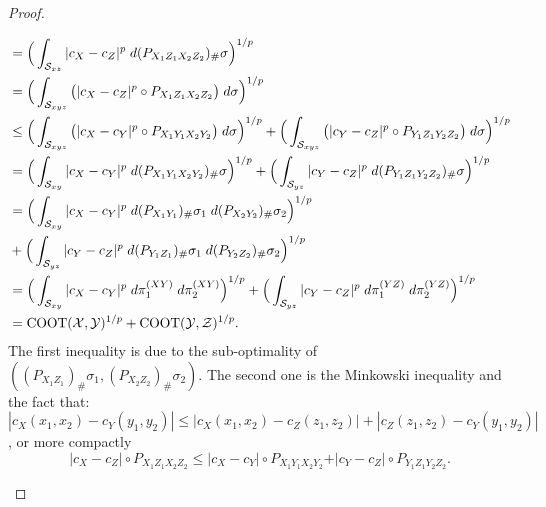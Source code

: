 \begin{proof}
\begin{enumerate}
\begin{equation}
\begin{split}
          &= \Big( \int_{\mathcal S_{xz}} \vert c_X - c_Z \vert^p
          \; d(P_{X_1 Z_1 X_2 Z_2})_{\#} \sigma \Big)^{1/p} \\
          &= \Big( \int_{\mathcal S_{xyz}} \big( \vert c_X - c_Z \vert^p \circ P_{X_1 Z_1 X_2 Z_2} \big)
          \; d \sigma \Big)^{1/p} \\
          &\leq \Big( \int_{\mathcal S_{xyz}} \big( \vert c_X - c_Y \vert^p \circ P_{X_1 Y_1 X_2 Y_2} \big)
          \; d \sigma \Big)^{1/p} +
          \Big( \int_{\mathcal S_{xyz}} \big( \vert c_Y - c_Z \vert^p \circ P_{Y_1 Z_1 Y_2 Z_2} \big)
          \; d \sigma \Big)^{1/p} \\
          &= \Big( \int_{\mathcal S_{xy}} \vert c_X - c_Y \vert^p
          \; d (P_{X_1 Y_1 X_2 Y_2})_{\#} \sigma \Big)^{1/p}  +
          \Big( \int_{\mathcal S_{yz}} \vert c_Y - c_Z \vert^p
          \; d (P_{Y_1 Z_1 Y_2 Z_2})_{\#} \sigma \Big)^{1/p}  \\
          &= \Big( \int_{\mathcal S_{xy}} \vert c_X - c_Y \vert^p
          \; d (P_{X_1 Y_1})_{\#} \sigma_1 \; d (P_{X_2 Y_2})_{\#} \sigma_2 \Big)^{1/p} \\
          &+ \Big( \int_{\mathcal S_{yz}} \vert c_Y - c_Z \vert^p
          \; d (P_{Y_1 Z_1})_{\#} \sigma_1 \; d (P_{Y_2 Z_2})_{\#} \sigma_2 \Big)^{1/p} \\
          &= \Big( \int_{\mathcal S_{xy}} \vert c_X - c_Y \vert^p \; d \pi^{(XY)}_1 \; d \pi^{(XY)}_2 \Big)^{1/p}  +
          \Big( \int_{\mathcal S_{yz}} \vert c_Y - c_Z \vert^p \; d \pi^{(YZ)}_1 \; d \pi^{(YZ)}_2 \Big)^{1/p} \\
          &= \text{COOT}(\mathcal X, \mathcal Y)^{1/p} + \text{COOT}(\mathcal Y, \mathcal Z)^{1/p}.
        \end{split}
      \end{equation}
      The first inequality is due to the sub-optimality of
      $((P_{X_1 Z_1})_{\#} \sigma_1, (P_{X_2 Z_2})_{\#} \sigma_2)$. The second one is
      the Minkowski inequality and the fact that: $|c_X(x_1,x_2) - c_Y(y_1,y_2)| \leq |c_X(x_1,x_2) - c_Z(z_1,z_2)| + |c_Z(z_1,z_2) - c_Y(y_1,y_2)|$,
      or more compactly
      \begin{equation}
        \vert c_X - c_Z \vert \circ P_{X_1 Z_1 X_2 Z_2} \leq
        \vert c_X - c_Y \vert \circ P_{X_1 Y_1 X_2 Y_2} +
        \vert c_Y - c_Z \vert \circ P_{Y_1 Z_1 Y_2 Z_2}.
      \end{equation}
    \end{enumerate}
\end{proof}

